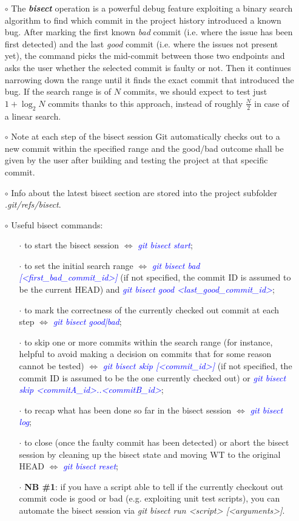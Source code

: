 \documentclass[a4paper,portrait,10pt]{article}   %
\newcommand{\mybulletlvA}{$\circ$}   %
\newcommand{\mybulletlvB}{$\cdot$}   %
\newcommand{\mydiv}{$\Leftrightarrow$ }   %
\newcommand{\mycmd}[1]{\textcolor{blue}{\textit{#1}}}   %
\newcommand{\myparvspace}{\vspace{4mm}}   %
\begin{document}
\begin{itemize}
\item[\mybulletlvA] The \textbf{\textit{bisect}} operation is a powerful debug feature exploiting a binary search algorithm to find which commit in the project history introduced a known bug. After marking the first known \textit{bad} commit (i.e. where the issue has been first detected) and the last \textit{good} commit (i.e. where the issues not present yet), the command picks the mid-commit between those two endpoints and asks the user whether the selected commit is faulty or not. Then it continues narrowing down the range until it finds the exact commit that introduced the bug. If the search range is of $N$ commits, we should expect to test just $1+\log_2 N$ commits thanks to this approach, instead of roughly $\frac{N}{2}$ in case of a linear search.
\myparvspace

\item[\mybulletlvA] Note at each step of the bisect session Git automatically checks out to a new commit within the specified range and the good/bad outcome shall be given by the user after building and testing the project at that specific commit.
\myparvspace

\item[\mybulletlvA] Info about the latest bisect section are stored into the project subfolder \textit{.git/refs/bisect}.
\myparvspace

\item[\mybulletlvA] Useful bisect commands:
\begin{itemize}
  \item[\mybulletlvB] to start the bisect session \mydiv \mycmd{git bisect start};
  \item[\mybulletlvB] to set the initial search range \mydiv \mycmd{git bisect bad [<first\_bad\_commit\_id>]} (if not specified, the commit ID is assumed to be the current HEAD) and \mycmd{git bisect good <last\_good\_commit\_id>};
  \item[\mybulletlvB] to mark the correctness of the currently checked out commit at each step \mydiv \mycmd{git bisect good|bad};
  \item[\mybulletlvB] to skip one or more commits within the search range (for instance, helpful to avoid making a decision on commits that for some reason cannot be tested) \mydiv \mycmd{git bisect skip [<commit\_id>]} (if not specified, the commit ID is assumed to be the one currently checked out) or \mycmd{git bisect skip <commitA\_id>..<commitB\_id>};
  \item[\mybulletlvB] to recap what has been done so far in the bisect session \mydiv \mycmd{git bisect log};
  \item[\mybulletlvB] to close (once the faulty commit has been detected) or abort the bisect session by cleaning up the bisect state and moving WT to the original HEAD \mydiv \mycmd{git bisect reset};
\item[\mybulletlvB] \textbf{NB \#1}: if you have a script able to tell if the currently checkout out commit code is good or bad (e.g. exploiting unit test scripts), you can automate the bisect session via \textit{git bisect run <script> [<arguments>]}.
\end{itemize}
\myparvspace


\end{itemize}
\end{document}
